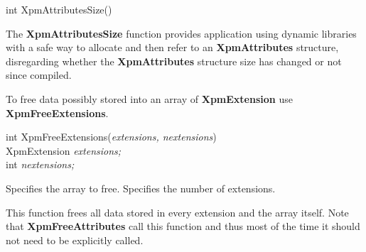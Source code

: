 \begin{flushleft} 

int XpmAttributesSize()

\end{flushleft}

The {\bf XpmAttributesSize} function provides application using dynamic
libraries with a safe way to allocate and then refer to an {\bf XpmAttributes}
structure, disregarding whether the {\bf XpmAttributes} structure size has
changed or not since compiled.

\vspace{.5cm}
To free data possibly stored into an array of {\bf XpmExtension} use {\bf
XpmFreeExtensions}.

\begin{flushleft} 

int XpmFreeExtensions({\it extensions, nextensions})\\

\hspace{1cm}XpmExtension {\it *extensions;}\\
\hspace{1cm}int {\it nextensions;}

\end{flushleft}

\begin{description}

 Specifies the array to free.
 Specifies the number of extensions.

\end{description}

This function frees all data stored in every extension and the array itself.
Note that {\bf XpmFreeAttributes} call this function and thus most of the time
it should not need to be explicitly called.

 
